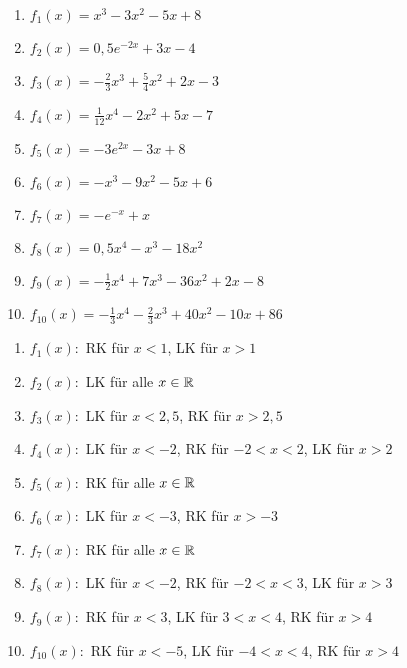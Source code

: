 \newpage
\begin{Exercise}[title={\raggedright Gib mit Hilfe der zweiten Ableitung die Intervalle an, in denen das Schaubild eine Links- bzw. Rechtskurve hat.}, label=kruemmungA1]
	\begin{enumerate}[label=\alph*)]
		\item \(f_1(x)=x^3-3x^2-5x+8\)
		\item \(f_2(x)=0,5e^{-2x}+3x-4\)
		\item \(f_3(x)=-\frac{2}{3}x^3+\frac{5}{4}x^2+2x-3\)
		\item \(f_4(x)=\frac{1}{12}x^4-2x^2+5x-7\)
		\item \(f_5(x)=-3e^{2x}-3x+8\)
		\item \(f_6(x)=-x^3-9x^2-5x+6\)
		\item \(f_7(x)=-e^{-x}+x\)
		\item \(f_8(x)=0,5x^4-x^3-18x^2\)
		\item \(f_9(x)=-\frac{1}{2}x^4+7x^3-36x^2+2x-8\)
		\item \(f_{10}(x)=-\frac{1}{3}x^4-\frac{2}{3}x^3+40x^2-10x+86\)
	\end{enumerate}
\end{Exercise}
\begin{Answer}[ref=kruemmungA1]
	\begin{enumerate}[label=\alph*)]
		\item \(f_1(x):\) RK für \(x<1\), LK für \(x>1\)
		\item \(f_2(x):\) LK für alle \(x\in \mathbb{R}\)
		\item \(f_3(x):\) LK für \(x<2,5\), RK für \(x>2,5\)
		\item \(f_4(x):\) LK für \(x<-2\), RK für \(-2<x<2\), LK für \(x>2\)
		\item \(f_5(x):\) RK für alle \(x\in \mathbb{R}\)
		\item \(f_6(x):\) LK für \(x<-3\), RK für \(x>-3\)
		\item \(f_7(x):\) RK für alle \(x\in \mathbb{R}\)
		\item \(f_8(x):\) LK für \(x<-2\), RK für \(-2<x<3\), LK für \(x>3\)
		\item \(f_9(x):\) RK für \(x<3\), LK für \(3<x<4\), RK für \(x>4\)
		\item \(f_{10}(x):\) RK für \(x<-5\), LK für \(-4<x<4\), RK für \(x>4\)
	\end{enumerate}
\end{Answer}